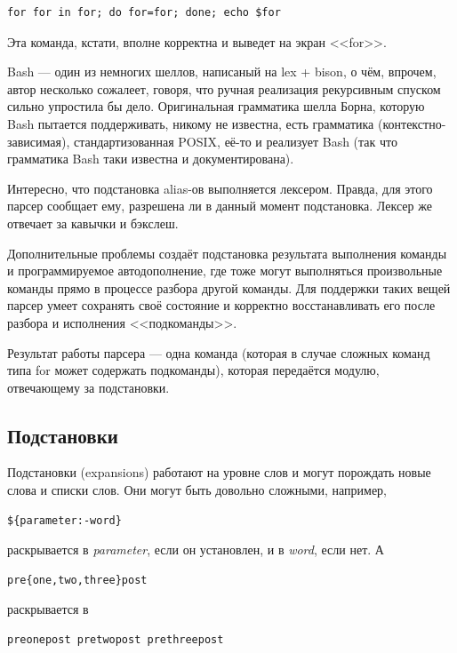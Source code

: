 \documentclass[a5paper]{article}
\begin{document}
\begin{verbatim}
for for in for; do for=for; done; echo $for
\end{verbatim}

Эта команда, кстати, вполне корректна и выведет на экран <<for>>.

Bash --- один из немногих шеллов, написаный на lex + bison, о чём, впрочем, автор несколько сожалеет, говоря, что ручная реализация рекурсивным спуском сильно упростила бы дело. Оригинальная грамматика шелла Борна, которую Bash пытается поддерживать, никому не известна, есть грамматика (контекстно-зависимая), стандартизованная POSIX, её-то и реализует Bash (так что грамматика Bash таки известна и документирована).

Интересно, что подстановка alias-ов выполняется лексером. Правда, для этого парсер сообщает ему, разрешена ли в данный момент подстановка. Лексер же отвечает за кавычки и бэкслеш.

Дополнительные проблемы создаёт подстановка результата выполнения команды и программируемое автодополнение, где тоже могут выполняться произвольные команды прямо в процессе разбора другой команды. Для поддержки таких вещей парсер умеет сохранять своё состояние и корректно восстанавливать его после разбора и исполнения <<подкоманды>>.

Результат работы парсера --- одна команда (которая в случае сложных команд типа for может содержать подкоманды), которая передаётся модулю, отвечающему за подстановки.

\subsection{Подстановки}

Подстановки (expansions) работают на уровне слов и могут порождать новые слова и списки слов. Они могут быть довольно сложными, например,

\begin{verbatim}
${parameter:-word}
\end{verbatim}

раскрывается в \textit{parameter}, если он установлен, и в \textit{word}, если нет. А

\begin{verbatim}
pre{one,two,three}post
\end{verbatim}

раскрывается в 

\begin{verbatim}
preonepost pretwopost prethreepost
\end{verbatim}
\end{document}
